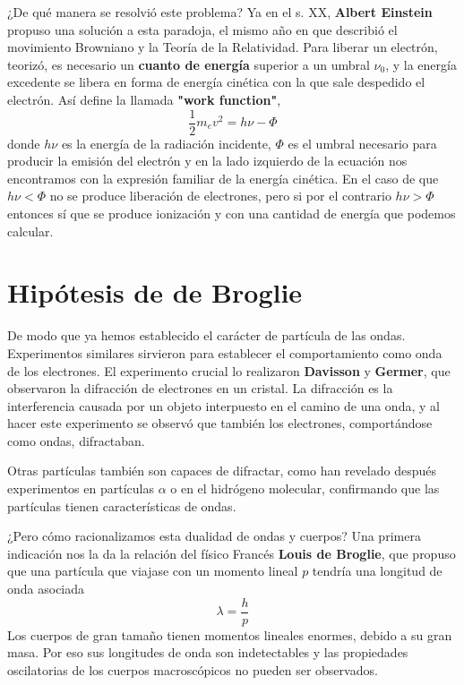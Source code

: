 ¿De qué manera se resolvió este problema? Ya en el s. XX, 
\textbf{Albert Einstein} propuso una solución a esta paradoja,
el mismo año en que describió el movimiento Browniano y la 
Teoría de la Relatividad. Para liberar un electrón, teorizó, es
necesario un \textbf{cuanto de energía} superior a un umbral $\nu_0$, y la
energía excedente se libera en forma de energía cinética con la
que sale despedido el electrón. Así define la llamada \textbf{"work
function"},
\begin{equation}
\frac{1}{2}m_ev^2=h\nu - \Phi
\end{equation}
donde $h\nu$ es la energía de la radiación incidente, $\Phi$ es
el umbral necesario para producir la emisión del electrón y
en la lado izquierdo de la ecuación nos encontramos con la 
expresión familiar de la energía cinética. En el caso de que
$h\nu<\Phi$ no se produce liberación de electrones, pero si
por el contrario $h\nu>\Phi$ entonces sí que se produce
ionización y con una cantidad de energía que podemos calcular.

\section{Hipótesis de de Broglie}
De modo que ya hemos establecido el carácter de partícula de las
ondas. Experimentos similares sirvieron para establecer
el comportamiento como onda de los electrones. El experimento
crucial lo realizaron \textbf{Davisson} y \textbf{Germer}, 
que observaron la difracción de electrones en un cristal. 
La difracción es la interferencia causada por un objeto 
interpuesto en el camino de una onda, y al hacer este experimento
se observó que también los electrones, comportándose como ondas,
difractaban.

Otras partículas también son capaces de difractar, como han 
revelado después experimentos en partículas $\alpha$ o en
el hidrógeno molecular, confirmando que las partículas tienen
características de ondas. 

¿Pero cómo racionalizamos esta dualidad de ondas y cuerpos?
Una primera indicación nos la da la relación del físico Francés
\textbf{Louis de Broglie}, que propuso que una partícula que viajase
con un momento lineal $p$ tendría una longitud de onda asociada
\begin{equation}
\lambda=\frac{h}{p}\label{eq:debroglie}
\end{equation}
Los cuerpos de gran tamaño tienen momentos lineales enormes, debido
a su gran masa. Por eso sus longitudes de onda son indetectables
y las propiedades oscilatorias de los cuerpos macroscópicos no 
pueden ser observados.	

